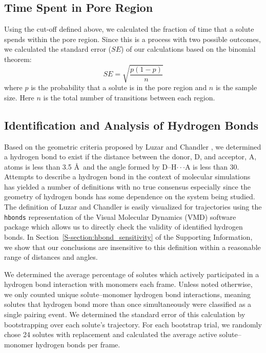 \documentclass[journal=jpcbfk,manuscript=article]{achemso}
\begin{document}
  \subsection{Time Spent in Pore Region}
  
  Using the cut-off defined above, we calculated the fraction of time
  that a solute spends within the pore region. Since this is a process
  with two possible outcomes, we calculated the standard error ($SE$) of our
  calculations based on the binomial theorem: 
  \begin{equation}
  SE = \sqrt{\dfrac{p(1-p)}{n}}
  \end{equation}
  where $p$ is the probability that a solute is in the pore region and
  $n$ is the sample size. Here $n$ is the total number of transitions
  between each region. 
  
  \subsection{Identification and Analysis of Hydrogen Bonds}\label{method:hbonds}  %

  Based on the geometric criteria proposed by Luzar and Chandler 
  \cite{luzar_effect_1996}, we determined a hydrogen bond to exist if the
  distance between the donor, D, and acceptor, A, atoms is less than 
  3.5 \AA~and the angle formed by D--H$\cdot\cdot\cdot$A is less than 30\degree. Attempts
  to describe a hydrogen bond in the context of molecular simulations has
  yielded a number of definitions with no true consensus 
  \cite{prada-gracia_quest_2013} especially since the geometry of hydrogen
  bonds has some dependence on the system being studied. The definition of
  Luzar and Chandler is easily visualized for trajectories using the 
  \texttt{hbonds} representation of the Visual Molecular Dynamics (VMD) software 
  package which allows us to directly check the validity of identified hydrogen bonds.
  In Section~\ref{S-section:hbond_sensitivity} of the Supporting Information, we
  show that our conclusions are insensitive to this definition within a 
  reasonable range of distances and angles. 
  
  We determined the average percentage of solutes
  which actively participated in a hydrogen bond interaction with monomers 
  each frame. Unless noted otherwise, we only counted unique solute--monomer
  hydrogen bond interactions, meaning solutes that hydrogen bond more than 
  once simultaneously were classified as a single pairing event. We determined
  the standard error of this calculation by bootstrapping over each solute's 
  trajectory. For each bootstrap trial, we randomly chose 24 solutes with 
  replacement and calculated the average active solute--monomer hydrogen bonds per frame.
\end{document}
